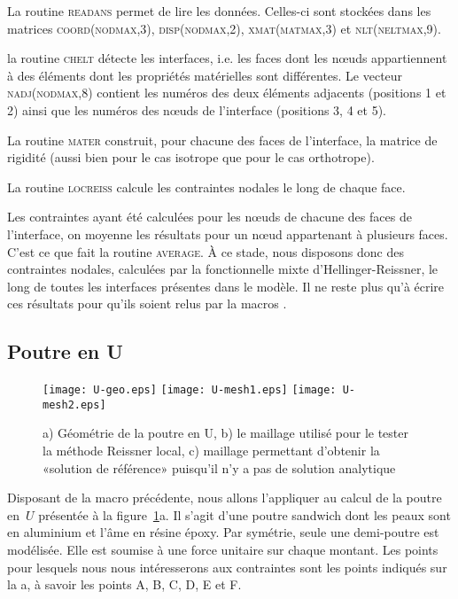 \medskip
La routine \textsc{readans} permet de lire les données. Celles-ci sont stockées dans les matrices \textsc{coord(nodmax,3), disp(nodmax,2), xmat(matmax,3)} et \textsc{nlt(neltmax,9)}.

\medskip
la routine \textsc{chelt} détecte les interfaces, i.e. les faces dont les nœuds appartiennent à des éléments dont les propriétés matérielles sont différentes.
Le vecteur \textsc{nadj(nodmax,8)} contient les numéros des deux éléments adjacents (positions 1 et 2) ainsi que les numéros des nœuds de l'interface (positions 3, 4 et 5).

\medskip
La routine \textsc{mater} construit, pour chacune des faces de l'interface, la matrice de rigidité (aussi bien pour le cas isotrope que pour le cas orthotrope).

\medskip
La routine \textsc{locreiss} calcule les contraintes nodales le long de chaque face.

\medskip
Les contraintes ayant été calculées pour les nœuds de chacune des faces de l'interface, on moyenne les résultats pour un nœud appartenant à plusieurs faces. C'est ce que fait la routine \textsc{average}. À ce stade, nous disposons donc des contraintes nodales, calculées par la fonctionnelle mixte d'Hellinger-Reissner, le long de toutes les interfaces présentes dans le modèle. Il ne reste plus qu'à écrire ces résultats pour qu'ils soient relus par la macros \ansys.




\medskip
\subsection{Poutre en U}

\begin{figure}[ht]
  \texttt{[image: U-geo.eps]} \hfill
  \texttt{[image: U-mesh1.eps]}\hfill
  \texttt{[image: U-mesh2.eps]}
  \caption{\label{Fig-poutU-geo} a) Géométrie de la poutre en U, b) le maillage utilisé pour le tester la méthode Reissner local, c) maillage permettant d'obtenir la «solution de référence» puisqu'il n'y a pas de solution analytique}
\end{figure}

Disposant de la macro précédente, nous allons l'appliquer au calcul de la poutre en~$U$ présentée à la figure~\ref{Fig-poutU-geo}a.
Il s'agit d'une poutre sandwich dont les peaux sont en aluminium et l'âme en résine époxy. Par symétrie, seule une demi-poutre est modélisée. Elle est soumise à une force unitaire sur chaque montant.
Les points pour lesquels nous nous intéresserons aux contraintes sont les points indiqués sur la a, à savoir les points A, B, C, D, E et F.

